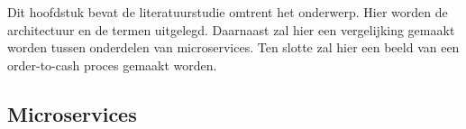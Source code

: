 \chapter{}
\label{ch:stand-van-zaken}



Dit hoofdstuk bevat de literatuurstudie omtrent het onderwerp. Hier worden de architectuur en de termen uitgelegd. Daarnaast zal hier een vergelijking gemaakt worden tussen onderdelen van microservices. Ten slotte zal hier een beeld van een order-to-cash proces gemaakt worden.

\section{Microservices}
